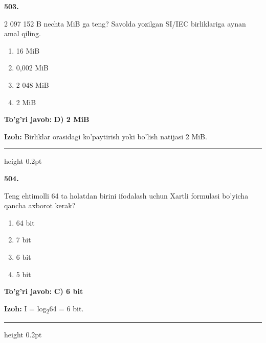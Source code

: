 \documentclass[10pt,a4paper,oneside]{article}
\begin{document}
\noindent\textbf{\color{ink}503.}
\par
2 097 152 B nechta MiB ga teng? Savolda yozilgan SI/IEC birliklariga aynan amal qiling.
\begin{enumerate}[label=\Alph*),leftmargin=9mm]
\item 16 MiB
\item 0,002 MiB
\item 2 048 MiB
\item 2 MiB
\end{enumerate}
\begin{tcolorbox}[enhanced,breakable,colback=teal!4,colframe=teal!50!black,boxrule=0.5pt,arc=1.1mm,left=3mm,right=3mm,top=1.7mm,bottom=1.7mm,before skip=2mm,after skip=2mm]
\textbf{\color{teal}To'g'ri javob:} \textbf{D) 2 MiB}
\par\smallskip
\textbf{Izoh:} Birliklar orasidagi ko'paytirish yoki bo'lish natijasi 2 MiB.
\end{tcolorbox}
\vspace{2mm}\hrule height 0.2pt \vspace{3mm}

\noindent\textbf{\color{ink}504.}
\par
Teng ehtimolli 64 ta holatdan birini ifodalash uchun Xartli formulasi bo'yicha qancha axborot kerak?
\begin{enumerate}[label=\Alph*),leftmargin=9mm]
\item 64 bit
\item 7 bit
\item 6 bit
\item 5 bit
\end{enumerate}
\begin{tcolorbox}[enhanced,breakable,colback=teal!4,colframe=teal!50!black,boxrule=0.5pt,arc=1.1mm,left=3mm,right=3mm,top=1.7mm,bottom=1.7mm,before skip=2mm,after skip=2mm]
\textbf{\color{teal}To'g'ri javob:} \textbf{C) 6 bit}
\par\smallskip
\textbf{Izoh:} I = log\textsubscript{2}64 = 6 bit.
\end{tcolorbox}
\vspace{2mm}\hrule height 0.2pt \vspace{3mm}
\end{document}
